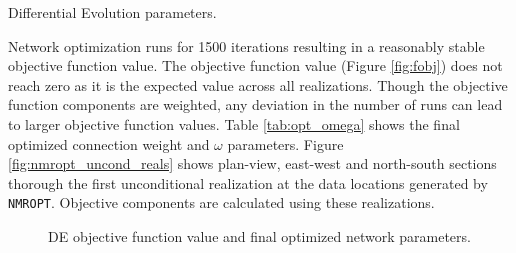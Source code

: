 \begin{table}[!htb]
    \centering
    \caption{Differential Evolution parameters.}
    \resizebox{0.9\width}{!}{}
    \label{tab:de_params}
\end{table}

Network optimization runs for 1500 iterations resulting in a reasonably stable objective function value. The objective function value (Figure \ref{fig:fobj}) does not reach zero as it is the expected value across all realizations. Though the objective function components are weighted, any deviation in the number of runs can lead to larger objective function values. Table \ref{tab:opt_omega} shows the final optimized connection weight and  $\omega$ parameters. Figure \ref{fig:nmropt_uncond_reals} shows plan-view, east-west and north-south sections thorough the first unconditional realization at the data locations generated by \texttt{NMROPT}. Objective components are calculated using these realizations.



\begin{figure}
    \centering
    \caption{\Gls{DE} objective function value and final optimized network parameters.}
\end{figure}


